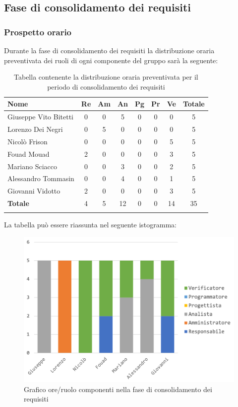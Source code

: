 		
		
	\subsection{Fase di consolidamento dei requisiti}
			\subsubsection{Prospetto orario}
			Durante la fase di consolidamento dei requisiti la distribuzione oraria preventivata dei ruoli di ogni componente del gruppo sarà la seguente:
			
			\begin{longtable}{|l|c|c|c|c|c|c|c|}
				\hline
				\rowcolor{lighter-grayer}
				\textbf{Nome} & \textbf{Re} & \textbf{Am} & \textbf{An} & \textbf{Pg}  & \textbf{Pr}   & \textbf{Ve} & \textbf{Totale} \\
				\hline
				\endfirsthead
				
				\hline
				Giuseppe Vito Bitetti & 0 & 0 & 5 & 0 & 0 & 0 & 5\\
				\hline
				\hline
				Lorenzo Dei Negri & 0 & 5 & 0 & 0 & 0 & 0 & 5\\
				\hline
				\hline
				Nicolò Frison & 0 & 0 & 0 & 0 & 0 & 5 & 5\\
				\hline
				\hline
				Fouad Mouad & 2 & 0 & 0 & 0 & 0 & 3 & 5\\
				\hline
				\hline
				Mariano Sciacco & 0 & 0 & 3 & 0 & 0 & 2 & 5\\
				\hline
				\hline
				Alessandro Tommasin & 0 & 0 & 4 & 0 & 0 & 1 & 5\\
				\hline
				\hline
				Giovanni Vidotto & 2 & 0 & 0 & 0 & 0 & 3 & 5\\
				\hline 
				\textbf{Totale} & 4 &  5 & 12 & 0 & 0 & 14 & 35\\
				\hline
				\caption{Tabella contenente la distribuzione oraria preventivata per il periodo di consolidamento dei requisiti}
			\end{longtable}
			\pagebreak
		
			La tabella può essere riassunta nel seguente istogramma:
			\begin{figure}[H]
				\centering
				\includegraphics[width=0.8\linewidth]{./images/preventivo/consRequisiti1.png}
				\caption{Grafico ore/ruolo componenti nella fase di consolidamento dei requisiti}
				\label{fig:grafico suddivione ruoli fase consolidamento requisiti}
			\end{figure}
		
